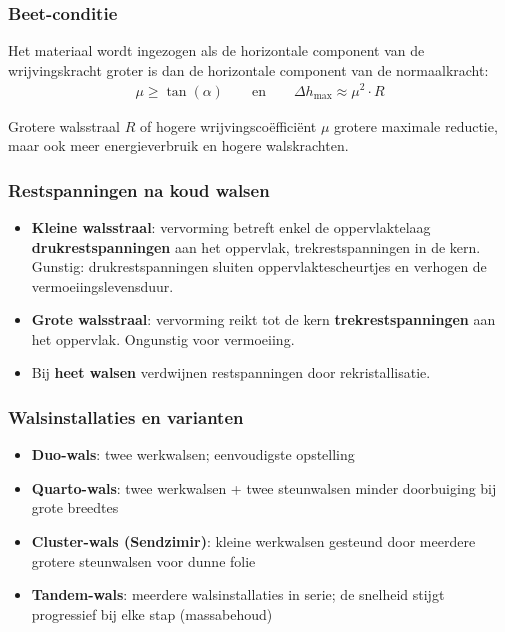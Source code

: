 \subsubsection{Beet-conditie}

Het materiaal wordt ingezogen als de horizontale component van de wrijvingskracht groter is dan de horizontale component van de normaalkracht:
\begin{align*}
    \mu \geq \tan(\alpha) \qquad \text{en} \qquad \Delta h_{\max} \approx \mu^2 \cdot R
\end{align*}

Grotere walsstraal $R$ of hogere wrijvingscoëfficiënt $\mu$ \textrightarrow{} grotere maximale reductie, maar ook meer energieverbruik en hogere walskrachten.

\subsubsection{Restspanningen na koud walsen}

\begin{itemize}
    \item \textbf{Kleine walsstraal}: vervorming betreft enkel de oppervlaktelaag \textrightarrow{} \textbf{drukrestspanningen} aan het oppervlak, trekrestspanningen in de kern. Gunstig: drukrestspanningen sluiten oppervlaktescheurtjes en verhogen de vermoeiingslevensduur.
    \item \textbf{Grote walsstraal}: vervorming reikt tot de kern \textrightarrow{} \textbf{trekrestspanningen} aan het oppervlak. Ongunstig voor vermoeiing.
    \item Bij \textbf{heet walsen} verdwijnen restspanningen door rekristallisatie.
\end{itemize}

\subsubsection{Walsinstallaties en varianten}

\begin{itemize}
    \item \textbf{Duo-wals}: twee werkwalsen; eenvoudigste opstelling
    \item \textbf{Quarto-wals}: twee werkwalsen + twee steunwalsen \textrightarrow{} minder doorbuiging bij grote breedtes
    \item \textbf{Cluster-wals (Sendzimir)}: kleine werkwalsen gesteund door meerdere grotere steunwalsen \textrightarrow{} voor dunne folie
    \item \textbf{Tandem-wals}: meerdere walsinstallaties in serie; de snelheid stijgt progressief bij elke stap (massabehoud)
\end{itemize}

